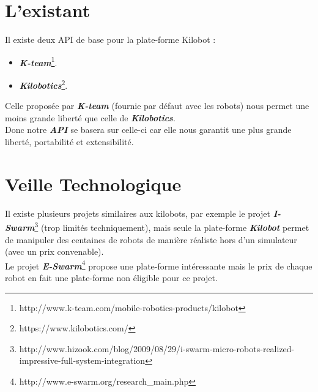 \documentclass[a4paper,8pt]{report}
\begin{document}
\bigskip

\section*{L'existant}\label{sec:name}

Il existe deux API de base pour la plate-forme Kilobot :\\

\begin{itemize}
\item \textit{\textbf{K-team}}\footnote{http://www.k-team.com/mobile-robotics-products/kilobot}.
\item \textit{\textbf{Kilobotics}}\footnote{https://www.kilobotics.com/}.
\end{itemize}

\medskip
Celle propos\'ee par \textit{\textbf{K-team}} (fournie par d\'efaut avec les robots) nous permet une moins grande libert\'e que celle de \textit{\textbf{Kilobotics}}.\\
Donc notre \textit{\textbf{API}} se basera sur celle-ci car elle nous garantit une plus grande libert\'e, portabilit\'e et extensibilit\'e.

\section*{Veille Technologique}\label{sec:name}

Il existe plusieurs projets similaires aux kilobots, par exemple le projet \textit{\textbf{I-Swarm}}\footnote{http://www.hizook.com/blog/2009/08/29/i-swarm-micro-robots-realized-impressive-full-system-integration} (trop limités techniquement), mais seule la plate-forme \textit{\textbf{Kilobot}} permet de manipuler des centaines de robots de mani\`ere r\'ealiste hors d'un simulateur (avec un prix convenable).\\
Le projet \textit{\textbf{E-Swarm}}\footnote{http://www.e-swarm.org/research_main.php} propose une plate-forme int\'eressante mais le prix de chaque robot en fait une plate-forme non \'eligible pour ce projet.\\
\end{document}
